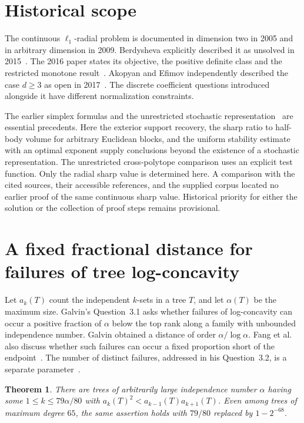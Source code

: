\documentclass[11pt,a4paper]{article}
\newtheorem{theorem}{Theorem}[section]\newtheorem{lemma}[theorem]{Lemma}\newtheorem{proposition}[theorem]{Proposition}\newtheorem{corollary}[theorem]{Corollary}
\numberwithin{equation}{section}
\begin{document}
\section{Historical scope}
The continuous $\ell_1$-radial problem is documented in dimension two in 2005 and in arbitrary dimension in 2009. Berdysheva explicitly described it as unsolved in 2015~\cite{BBmem}. The 2016 paper states its objective, the positive definite class and the restricted monotone result~\cite{BB16}. Akopyan and Efimov independently described the case $d\ge3$ as open in 2017~\cite{AE}. The discrete coefficient questions introduced alongside it have different normalization constraints.

The earlier simplex formulas and the unrestricted stochastic representation~\cite{CKS,BB16} are essential precedents. Here the exterior support recovery, the sharp ratio to half-body volume for arbitrary Euclidean blocks, and the uniform stability estimate with an optimal exponent supply conclusions beyond the existence of a stochastic representation. The unrestricted cross-polytope comparison uses an explicit test function. Only the radial sharp value is determined here. A comparison with the cited sources, their accessible references, and the supplied corpus located no earlier proof of the same continuous sharp value. Historical priority for either the solution or the collection of proof steps remains provisional.

\appendix\clearpage


\section{A fixed fractional distance for failures of tree log-concavity}
\label{sec:galvinbulk}

Let $a_k(T)$ count the independent $k$-sets in a tree $T$, and let
$\alpha(T)$ be the maximum size. Galvin's Question~3.1
\cite{GalvinBulk} asks whether failures of log-concavity can occur a
positive fraction of $\alpha$ below the top rank along a family with
unbounded independence number. Galvin obtained a distance of order
$\alpha/\log\alpha$. Fang et al. also discuss whether such failures can occur a fixed proportion short of the endpoint~\cite[Sec.~9]{Fang}. The number of distinct failures, addressed in his
Question~3.2, is a separate parameter~\cite{BautistaBulk}.
\begin{theorem}\label{thm:galvinbulk}
There are trees of arbitrarily large independence number $\alpha$
having some $1\le k\le 79\alpha/80$ with
$a_k(T)^2<a_{k-1}(T)a_{k+1}(T)$.
Even among trees of maximum degree $65$, the same assertion holds
with $79/80$ replaced by $1-2^{-68}$.
\end{theorem}
\end{document}
